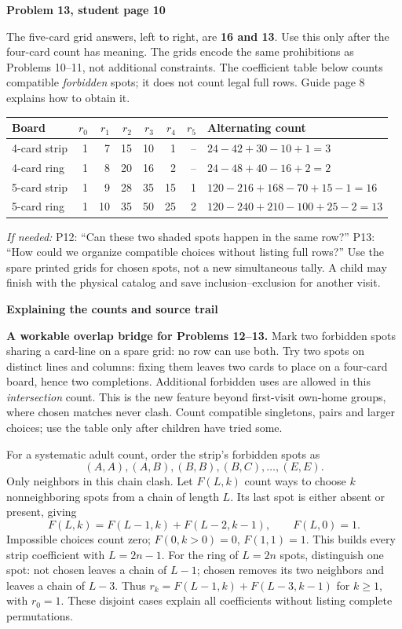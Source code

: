 \documentclass[11pt]{article}
\newcommand{\head}[1]{\par\textbf{\large #1}\par}
\newcommand{\sub}[1]{\par\textbf{#1}\par}
\newcommand{\hint}[1]{\emph{If needed:} #1}
\begin{document}
\sub{Problem 13, student page 10}
The five-card grid answers, left to right, are \textbf{16 and 13}. Use this only after the four-card count has meaning. The grids encode the same prohibitions as Problems 10--11, not additional constraints. The coefficient table below counts compatible \emph{forbidden} spots; it does not count legal full rows. Guide page 8 explains how to obtain it.
\begin{center}\small\renewcommand{\arraystretch}{1.15}
\begin{tabular}{lrrrrrrl}
Board & $r_0$&$r_1$&$r_2$&$r_3$&$r_4$&$r_5$ & Alternating count\\\midrule
4-card strip &1&7&15&10&1&--&$24-42+30-10+1=3$\\
4-card ring &1&8&20&16&2&--&$24-48+40-16+2=2$\\
5-card strip &1&9&28&35&15&1&$120-216+168-70+15-1=16$\\
5-card ring &1&10&35&50&25&2&$120-240+210-100+25-2=13$
\end{tabular}
\end{center}
\hint{P12: ``Can these two shaded spots happen in the same row?'' P13: ``How could we organize compatible choices without listing full rows?''} Use the spare printed grids for chosen spots, not a new simultaneous tally. A child may finish with the physical catalog and save inclusion--exclusion for another visit.
\newpage
\head{Explaining the counts and source trail}
\textbf{A workable overlap bridge for Problems 12--13.} Mark two forbidden spots sharing a card-line on a spare grid: no row can use both. Try two spots on distinct lines and columns: fixing them leaves two cards to place on a four-card board, hence two completions. Additional forbidden uses are allowed in this \emph{intersection} count. This is the new feature beyond first-visit own-home groups, where chosen matches never clash. Count compatible singletons, pairs and larger choices; use the table only after children have tried some.

For a systematic adult count, order the strip's forbidden spots as
\[
(A,A),(A,B),(B,B),(B,C),\ldots,(E,E).
\]
Only neighbors in this chain clash. Let $F(L,k)$ count ways to choose $k$ nonneighboring spots from a chain of length $L$. Its last spot is either absent or present, giving
\[
F(L,k)=F(L-1,k)+F(L-2,k-1),\qquad F(L,0)=1.
\]
Impossible choices count zero; $F(0,k>0)=0$, $F(1,1)=1$. This builds every strip coefficient with $L=2n-1$. For the ring of $L=2n$ spots, distinguish one spot: not chosen leaves a chain of $L-1$; chosen removes its two neighbors and leaves a chain of $L-3$. Thus $r_k=F(L-1,k)+F(L-3,k-1)$ for $k\ge1$, with $r_0=1$. These disjoint cases explain all coefficients without listing complete permutations.
\end{document}
